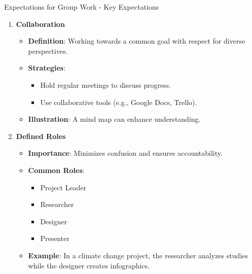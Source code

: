 \documentclass[aspectratio=169]{beamer}
\begin{document}
\begin{frame}[fragile]{Expectations for Group Work - Key Expectations}
    \begin{enumerate}
        \item \textbf{Collaboration}
        \begin{itemize}
            \item \textbf{Definition}: Working towards a common goal with respect for diverse perspectives.
            \item \textbf{Strategies}:
            \begin{itemize}
                \item Hold regular meetings to discuss progress.
                \item Use collaborative tools (e.g., Google Docs, Trello).
            \end{itemize}
            \item \textbf{Illustration}: A mind map can enhance understanding.
        \end{itemize}
        
        \item \textbf{Defined Roles}
        \begin{itemize}
            \item \textbf{Importance}: Minimizes confusion and ensures accountability.
            \item \textbf{Common Roles}:
            \begin{itemize}
                \item Project Leader
                \item Researcher
                \item Designer
                \item Presenter
            \end{itemize}
            \item \textbf{Example}: In a climate change project, the researcher analyzes studies while the designer creates infographics.
        \end{itemize}
    \end{enumerate}
\end{frame}
\end{document}
